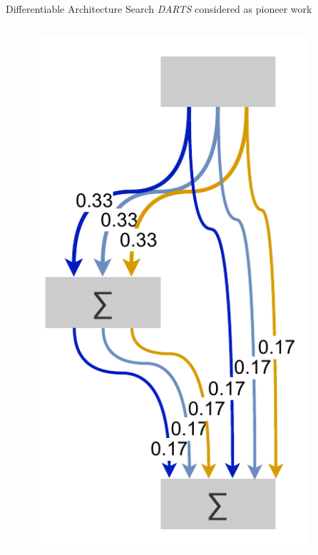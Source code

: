 \documentclass[]{beamer}
\begin{document}
\begin{frame}{Differentiable Architecture Search}
\vspace{10pt}
\textit{DARTS} \cite{Liu2018} considered as pioneer work
\vfill
\begin{columns}
\begin{column}{.35\textwidth}
\begin{figure}
	\includegraphics[scale=0.4, center]{graphics/darts_1.pdf}
\end{figure}
\end{column}
\begin{column}{.3\textwidth}
\end{column}
\begin{column}{.35\textwidth}
\end{column}
\end{columns}
\end{frame}
\end{document}
